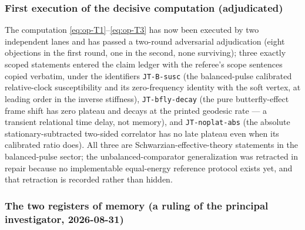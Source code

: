 \subsubsection*{First execution of the decisive computation (adjudicated)}

The computation \eqref{eq:op-T1}--\eqref{eq:op-T3} has now been executed by
two independent lanes and has passed a two-round adversarial adjudication
(eight objections in the first round, one in the second, none surviving);
three exactly scoped statements entered the claim ledger with the referee's
scope sentences copied verbatim, under the identifiers
\texttt{JT-B-susc} (the balanced-pulse calibrated relative-clock
susceptibility and its zero-frequency identity with the soft vertex, at
leading order in the inverse stiffness), \texttt{JT-bfly-decay} (the pure
butterfly-effect frame shift has zero plateau and decays at the printed
geodesic rate --- a transient relational time delay, not memory), and
\texttt{JT-noplat-abs} (the absolute stationary-subtracted two-sided
correlator has no late plateau even when its calibrated ratio does). All
three are Schwarzian-effective-theory statements in the balanced-pulse
sector; the unbalanced-comparator generalization was retracted in repair
because no implementable equal-energy reference protocol exists yet, and
that retraction is recorded rather than hidden.

\subsubsection*{The two registers of memory (a ruling of the principal
investigator, 2026-08-31)}

